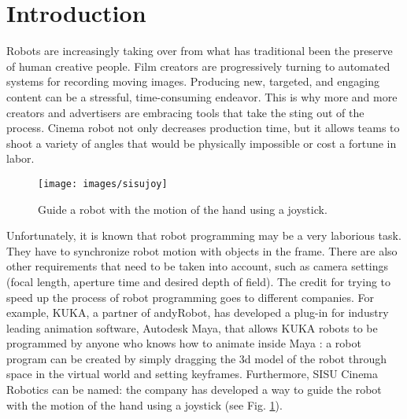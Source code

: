 \chapter*{Introduction}
\markboth{}{}
\label{chap:intro}


Robots are increasingly taking over from what has traditional been the preserve of human creative people. Film creators are progressively turning to automated systems for recording moving images. Producing new, targeted, and engaging content can be a stressful, time-consuming endeavor. This is why more and more creators and advertisers are embracing tools that take the sting out of the process. Cinema robot not only decreases production time, but it allows teams to shoot a variety of angles that would be physically impossible or cost a fortune in labor. \\

\begin{figure}[H]
	\centering
	\texttt{[image: images/sisujoy]}
	\caption[Guide a robot with the motion of the hand using a joystick.]{Guide a robot with the motion of the hand using a joystick.}
	\label{fig:drnsisu}
\end{figure}

\noindent Unfortunately, it is known that robot programming may be a very laborious task. They have to synchronize robot motion with objects in the frame. There are also other requirements that need to be taken into account, such as camera settings (focal length, aperture time and desired depth of field). The credit for trying to speed up the process of robot programming goes to different companies. For example, KUKA, a partner of andyRobot, has developed a plug-in for industry leading animation software, Autodesk Maya, that allows KUKA robots to be programmed by anyone who knows how to animate inside Maya \cite[]{Animatin29:online}: a robot program can be created by simply dragging the \gls{3d} model of the robot through space in the virtual world and setting keyframes. Furthermore, SISU Cinema Robotics can be named: the company has developed a way to guide the robot with the motion of the hand using a joystick \cite[]{SISUCine24:online} (see Fig. \ref{fig:drnsisu}). \\

